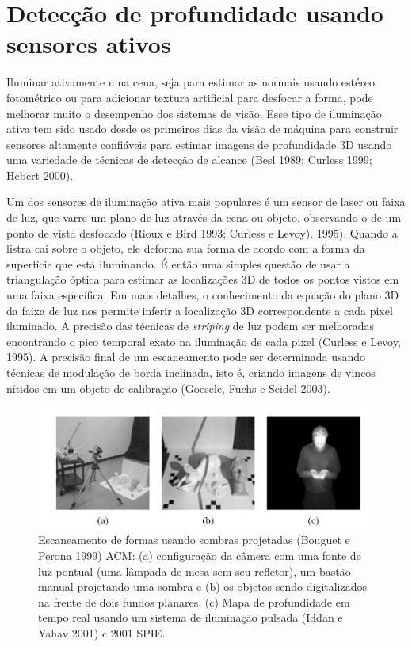 \documentclass{article}
\begin{document}
\section{Detecção de profundidade usando sensores ativos}

Iluminar ativamente uma cena, seja para estimar as normais usando estéreo fotométrico ou para adicionar textura artificial para desfocar a forma, pode melhorar muito o desempenho dos sistemas de visão. Esse tipo de iluminação ativa tem sido usado desde os primeiros dias da visão de máquina para construir sensores altamente confiáveis para estimar imagens de profundidade 3D usando uma variedade de técnicas de detecção de alcance (Besl 1989; Curless 1999; Hebert 2000).

Um dos sensores de iluminação ativa mais populares é um sensor de laser ou faixa de luz, que varre um plano de luz através da cena ou objeto, observando-o de um ponto de vista desfocado (Rioux e Bird 1993; Curless e Levoy). 1995). Quando a listra cai sobre o objeto, ele deforma sua forma de acordo com a forma da superfície que está iluminando. É então uma simples questão de usar a triangulação óptica para estimar as localizações 3D de todos os pontos vistos em uma faixa específica. Em mais detalhes, o conhecimento da equação do plano 3D da faixa de luz nos permite inferir a localização 3D correspondente a cada pixel iluminado. A precisão das técnicas de \textit{striping} de luz podem ser melhoradas encontrando o pico temporal exato na iluminação de cada pixel (Curless e Levoy, 1995). A precisão final de um escaneamento pode ser determinada usando técnicas de modulação de borda inclinada, isto é, criando imagens de vincos nítidos em um objeto de calibração (Goesele, Fuchs e Seidel 2003).

\begin{figure}[!htb]
    \centering
    \includegraphics[width=1.0\textwidth]{escaneamentoDeFormas.png}
    \caption{Escaneamento de formas usando sombras projetadas (Bouguet e Perona 1999) ACM: (a) configuração da câmera com uma fonte de luz pontual (uma lâmpada de mesa sem seu refletor), um bastão manual projetando uma sombra e (b) os objetos sendo digitalizados na frente de dois fundos planares. (c) Mapa de profundidade em tempo real usando um sistema de iluminação pulsada (Iddan e Yahav 2001) c 2001 SPIE.}
    \label{fig:escaneamentoDeFormas}
\end{figure}
\end{document}

